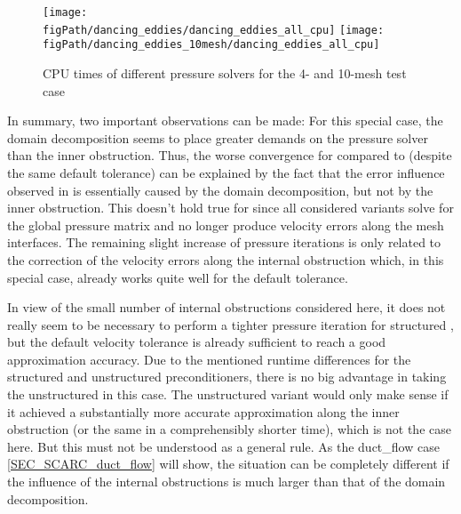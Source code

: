 \begin{figure}[ht]
\begin{center}
\texttt{[image: \\figPath/dancing\_eddies/dancing\_eddies\_all\_cpu]}
\texttt{[image: \\figPath/dancing\_eddies\_10mesh/dancing\_eddies\_all\_cpu]}
\end{center}
\caption[CPU times of different pressure solvers for the 4- and 10-mesh {} test cases]{CPU times of different pressure solvers for the 4- and 10-mesh {} test case}
\label{FIG_scarc_dancing_eddies_cpu}
\end{figure}

In summary, two important observations can be made:
%
For this special case, the domain decomposition seems to place greater demands on the pressure solver than the inner obstruction.
Thus, the worse convergence for \fftdefault{} compared to \scarcdefault{} (despite the same default tolerance) can be explained by the fact that the error influence observed in \fftdefault{} is essentially caused by the domain decomposition, but not by the inner obstruction. 
This doesn't hold true for \scarc{}
since all considered variants solve for the global pressure matrix and no longer produce velocity errors along the mesh interfaces. The remaining slight increase of pressure iterations is only related to the correction of the velocity errors along the internal obstruction which, in this special case, already works quite well for the default tolerance.  

In view of the small number of internal obstructions considered here, it does not really seem to be necessary to perform a tighter pressure iteration for structured \scarc{}, but the default velocity tolerance is already sufficient to reach a good approximation accuracy. 
Due to the mentioned runtime differences for the structured and unstructured preconditioners, there is no big advantage in taking the unstructured \uscarc{} in this case. The unstructured variant would only make sense if it achieved a substantially more accurate approximation along the inner obstruction (or the same in a comprehensibly shorter time), which is not the case here.
But this must not be understood as a general rule. As the {\ct duct\_flow} case \ref{SEC_SCARC_duct_flow} will show, the situation can be completely different if the influence of the internal obstructions is much larger than that of the domain decomposition.


